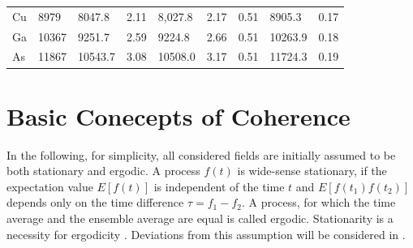 \begin{table}
\begin{tabular}{l|l|ll|lll|ll}
		Cu      & 8979                                                   & 8047.8                                                & 2.11                                                 & 8,027.8                                                & 2.17                                                 & 0.51                                                      & 8905.3                                                & 0.17                                                      \\
		Ga      & 10367                                                  & 9251.7                                                 & 2.59                                                 & 9224.8                                                 & 2.66                                                 & 0.51                                                      & 10263.9                                               & 0.18                                                      \\
		As      & 11867                                                  & 10543.7                                                & 3.08                                                 & 10508.0                                                & 3.17                                                 & 0.51                                                      & 11724.3                                               & 0.19                                                      \\ \hline
	\end{tabular}
\end{table}

\section{Basic Conecepts of Coherence}
In the following, for simplicity, all considered fields are initially assumed to be both stationary and ergodic. A process $f(t)$ is wide-sense stationary, if the expectation value $E[f(t)]$ is independent of the time $t$ and $E[f(t_1)f(t_2)]$ depends only on the time difference $\tau=f_1-f_2$. A process, for which the time average and the ensemble average are equal is called ergodic. Stationarity is a necessity for ergodicity \cite{goodman2000}. Deviations from this assumption will be considered in .


